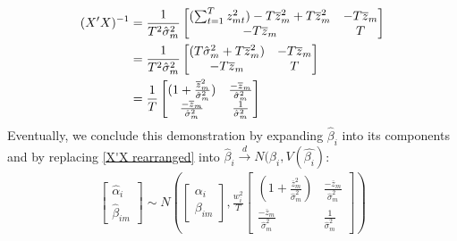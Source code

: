 \documentclass[]{article}
\begin{document}
\begin{align} \label{X'X rearranged}
	(X'X)^{-1} &=  \frac{1}{T^2\hat{\sigma}_{m}^2} 
	\begin{bmatrix} (\sum_{t=1}^{T}z_{mt}^2) -T\overline{z}_m^2 + T\overline{z}_m^2 & -T\overline{z}_m \\ -T\overline{z}_m & T \end{bmatrix} \notag \\
	&= 	\frac{1}{T^2\hat{\sigma}_{m}^2}
	\begin{bmatrix} (T\hat{\sigma}_{m}^2 + T\overline{z}_m^2) & -T\overline{z}_m \\ -T\overline{z}_m & T \end{bmatrix} \notag \\
	&=  \frac{1}{T} 
	\begin{bmatrix} (1 + \frac{\overline{z}_m^2}{\hat{\sigma}_{m}^2}) & \frac{-\overline{z}_m}{\hat{\sigma}_{m}^2} \\ \frac{-\overline{z}_m}{\hat{\sigma}_{m}^2} & \frac{1}{\hat{\sigma}_{m}^2} \end{bmatrix}   
\end{align}
Eventually, we conclude this demonstration by expanding $\hat{\beta}_i$ into its components and by replacing \ref{X'X rearranged} into $\hat{\beta}_i \overset{d}{\to} N(\beta_i,V(\hat{\beta_i})$:
\begin{align}
	\begin{bmatrix} \hat{\alpha}_i \\ \hat{\beta}_{im} \end{bmatrix}
	\sim N(\begin{bmatrix} \alpha_i \\ \beta_{im} \end{bmatrix}, \frac{w_i^2}{T}\begin{bmatrix} (1 + \frac{\overline{z}_m^2}{\hat{\sigma}_{m}^2}) & \frac{-\overline{z}_m}{\hat{\sigma}_{m}^2} \\ \frac{-\overline{z}_m}{\hat{\sigma}_{m}^2} & \frac{1}{\hat{\sigma}_{m}^2} \end{bmatrix}) 
\end{align}
\end{document}
